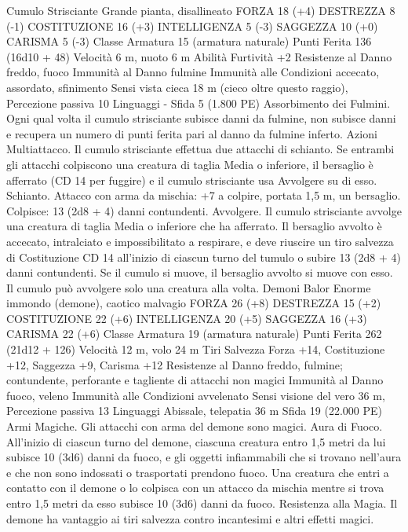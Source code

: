 \begin{multicols}{2}
Cumulo Strisciante
Grande pianta, disallineato
FORZA 18 (+4)
DESTREZZA 8 (-1)
COSTITUZIONE 16 (+3)
INTELLIGENZA 5 (-3)
SAGGEZZA 10 (+0)
CARISMA 5 (-3)
Classe Armatura 15 (armatura naturale)
Punti Ferita 136 (16d10 + 48)
Velocità 6 m, nuoto 6 m
Abilità Furtività +2
Resistenze al Danno freddo, fuoco
Immunità al Danno fulmine
Immunità alle Condizioni accecato, assordato, sfinimento
Sensi vista cieca 18 m (cieco oltre questo raggio), Percezione
passiva 10
Linguaggi -
Sfida 5 (1.800 PE)
Assorbimento dei Fulmini. Ogni qual volta il cumulo strisciante
subisce danni da fulmine, non subisce danni e recupera un
numero di punti ferita pari al danno da fulmine inferto.
Azioni
Multiattacco. Il cumulo strisciante effettua due attacchi di
schianto. Se entrambi gli attacchi colpiscono una creatura di
taglia Media o inferiore, il bersaglio è afferrato (CD 14 per
fuggire) e il cumulo strisciante usa Avvolgere su di esso.
Schianto. Attacco con arma da mischia: +7 a colpire, portata 1,5
m, un bersaglio.
Colpisce: 13 (2d8 + 4) danni contundenti.
Avvolgere. Il cumulo strisciante avvolge una creatura di taglia
Media o inferiore che ha afferrato. Il bersaglio avvolto è
accecato, intralciato e impossibilitato a respirare, e deve riuscire
un tiro salvezza di Costituzione CD 14 all’inizio di ciascun turno
del tumulo o subire 13 (2d8 + 4) danni contundenti. Se il cumulo
si muove, il bersaglio avvolto si muove con esso. Il cumulo può
avvolgere solo una creatura alla volta.
Demoni
Balor
Enorme immondo (demone), caotico malvagio
FORZA 26 (+8)
DESTREZZA 15 (+2)
COSTITUZIONE 22 (+6)
INTELLIGENZA 20 (+5)
SAGGEZZA 16 (+3)
CARISMA 22 (+6)
Classe Armatura 19 (armatura naturale)
Punti Ferita 262 (21d12 + 126)
Velocità 12 m, volo 24 m
Tiri Salvezza Forza +14, Costituzione +12, Saggezza +9,
Carisma +12
Resistenze al Danno freddo, fulmine; contundente, perforante e
tagliente di attacchi non magici
Immunità al Danno fuoco, veleno
Immunità alle Condizioni avvelenato
Sensi visione del vero 36 m, Percezione passiva 13
Linguaggi Abissale, telepatia 36 m
Sfida 19 (22.000 PE)
Armi Magiche. Gli attacchi con arma del demone sono magici.
Aura di Fuoco. All’inizio di ciascun turno del demone, ciascuna
creatura entro 1,5 metri da lui subisce 10 (3d6) danni da fuoco, e
gli oggetti infiammabili che si trovano nell’aura e che non sono
indossati o trasportati prendono fuoco. Una creatura che entri a
contatto con il demone o lo colpisca con un attacco da mischia
mentre si trova entro 1,5 metri da esso subisce 10 (3d6) danni da
fuoco.
Resistenza alla Magia. Il demone ha vantaggio ai tiri salvezza
contro incantesimi e altri effetti magici.

\end{multicols}
